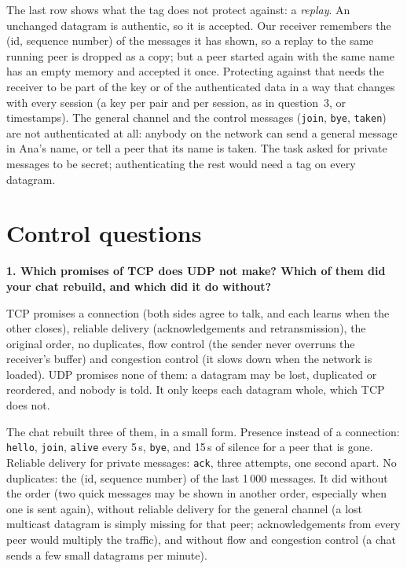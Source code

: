 \documentclass[11pt,a4paper]{article}
\newcommand{\question}[1]{\par\medskip\textbf{#1}\par}
\newcommand{\code}[1]{{\frenchspacing\texttt{#1}}}
\begin{document}
The last row shows what the tag does not protect against: a \emph{replay}. An unchanged datagram is
authentic, so it is accepted. Our receiver remembers the (id, sequence number) of the messages it has
shown, so a replay to the same running peer is dropped as a copy; but a peer started again with the
same name has an empty memory and accepted it once. Protecting against that needs the receiver to
be part of the key or of the authenticated data in a way that changes with every session (a key per
pair and per session, as in question~3, or timestamps). The general channel and the control
messages (\code{join}, \code{bye}, \code{taken}) are not authenticated at all: anybody on the
network can send a general message in Ana's name, or tell a peer that its name is taken. The task
asked for private messages to be secret; authenticating the rest would need a tag on every datagram.

\section{Control questions}\label{sec:control}

\question{1. Which promises of TCP does UDP not make? Which of them did your chat rebuild, and which
did it do without?}

TCP promises a connection (both sides agree to talk, and each learns when the other closes), reliable
delivery (acknowledgements and retransmission), the original order, no duplicates, flow control (the
sender never overruns the receiver's buffer) and congestion control (it slows down when the network
is loaded). UDP promises none of them: a datagram may be lost, duplicated or reordered, and nobody is
told. It only keeps each datagram whole, which TCP does not.

The chat rebuilt three of them, in a small form. Presence instead of a connection: \code{hello},
\code{join}, \code{alive} every 5\,s, \code{bye}, and 15\,s of silence for a peer that is gone.
Reliable delivery for private messages: \code{ack}, three attempts, one second apart. No duplicates:
the (id, sequence number) of the last 1\,000 messages. It did without the order (two quick messages
may be shown in another order, especially when one is sent again), without reliable delivery for
the general channel (a lost multicast datagram is simply missing for that peer; acknowledgements
from every peer would multiply the traffic), and without flow and congestion control (a chat sends
a few small datagrams per minute).
\end{document}
